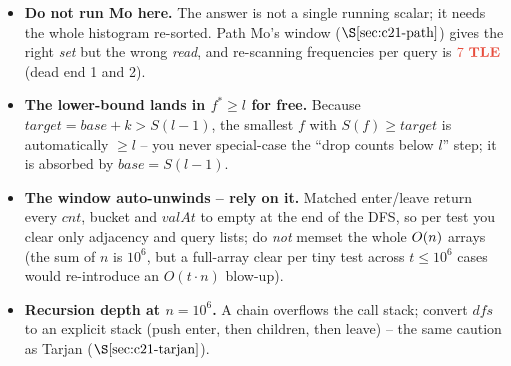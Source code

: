 \begin{hardeningbox}
\begin{itemize}[nosep,leftmargin=1.4em]
  \item \textbf{Do not run Mo here.} The answer is not a single running scalar; it needs
        the whole histogram re-sorted. Path Mo's window (\(\secref{c21-path}\)) gives the
        right \emph{set} but the wrong \emph{read}, and re-scanning frequencies per query
        is \(\tle\) (dead end 1 and 2).
  \item \textbf{The lower-bound lands in \(f^\ast\ge l\) for free.} Because
        \(\mathit{target}=\mathit{base}+k > S(l-1)\), the smallest \(f\) with
        \(S(f)\ge\mathit{target}\) is automatically \(\ge l\) -- you never special-case
        the ``drop counts below \(l\)'' step; it is absorbed by \(\mathit{base}=S(l-1)\).
  \item \textbf{The window auto-unwinds -- rely on it.} Matched enter/leave return every
        \(\mathit{cnt}\), bucket and \(\mathit{valAt}\) to empty at the end of the DFS, so
        per test you clear only adjacency and query lists; do \emph{not} memset the whole
        \(O(n)\) arrays (the sum of \(n\) is \(10^6\), but a full-array clear per tiny
        test across \(t\le10^6\) cases would re-introduce an \(O(t\cdot n)\) blow-up).
  \item \textbf{Recursion depth at \(n=10^6\).} A chain overflows the call stack; convert
        \(\mathit{dfs}\) to an explicit stack (push enter, then children, then leave) --
        the same caution as Tarjan (\(\secref{c21-tarjan}\)).
\end{itemize}
\end{hardeningbox}

